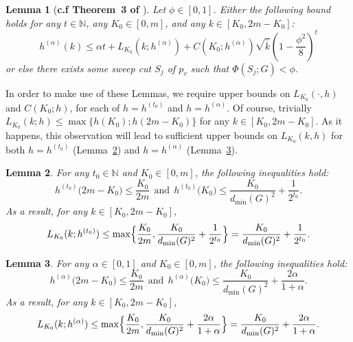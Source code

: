 \documentclass{article}
\newcommand{\1}{\mathbf{1}}
\newtheorem{lemma}{Lemma}[section]
\theoremstyle{definition}
\theoremstyle{remark}
\begin{document}
\begin{lemma}[\textbf{c.f Theorem~3 of \citep{andersen2006}}]
	\label{lem:mixing_time_PPR}
	Let $\phi \in [0,1]$. Either the following bound holds for any $t \in \mathbb{N}$, any $K_0 \in [0,m]$, and any $k \in [K_0,2m - K_0]$:
	\begin{equation}
	\label{eqn:mixing_time_PPR}
	h^{(\alpha)}(k) \leq \alpha t + L_{K_0}(k; h^{(\alpha)}) + C(K_0;h^{(\alpha)})\sqrt{\overline{k}}\left(1 - \frac{\phi^2}{8}\right)^t
	\end{equation}
	or else there exists some sweep cut $S_{j}$ of $p_v$ such that $\Phi(S_j;G) < \phi$.
\end{lemma}

In order to make use of these Lemmas, we require upper bounds on $L_{K_0}(\cdot,h)$ and $C(K_0;h)$, for each of $h = h^{(t_0)}$ and $h = h^{(\alpha)}$. Of course, trivially $L_{K_0}(k;h) \leq \max\{h(K_0); h(2m - K_0)\}$ for any $k \in [K_0, 2m - K_0]$. As it happens, this observation will lead to sufficient upper bounds on $L_{K_0}(k,h)$ for both $h = h^{(t_0)}$ (Lemma~\ref{lem:interpolator_bound_rw}) and $h = h^{(\alpha)}$ (Lemma~\ref{lem:interpolator_bound_ppr}).  
\begin{lemma}
	\label{lem:interpolator_bound_rw}
	For any $t_0 \in \mathbb{N}$ and $K_0 \in [0,m]$, the following inequalities hold:
	\begin{equation}
	\label{eqn:interpolator_bound_rw}
	h^{(t_0)}\bigl(2m - K_0\bigr) \leq \frac{K_0}{2m}~~\textrm{and}~~h^{(t_0)}\bigl(K_0\bigr) \leq \frac{K_0}{d_{\min}(G)^2} + \frac{1}{2^{t_0}}.
	\end{equation}
	As a result, for any $k \in [K_0, 2m - K_0]$,
	\begin{equation}
	\label{eqn:interpolator_bound_rw_2}
	L_{K_0}(k;h^{(t_0)}) \leq \max\Bigl\{\frac{K_0}{2m}, \frac{K_0}{d_{\min}(G)^2} + \frac{1}{2^{t_0}}\Bigr\} = \frac{K_0}{d_{\min}(G)^2} + \frac{1}{2^{t_0}}.
	\end{equation}
\end{lemma}

\begin{lemma}
	\label{lem:interpolator_bound_ppr}
	For any $\alpha \in [0,1]$ and $K_0 \in [0,m]$, the following inequalities hold:
	\begin{equation}
	\label{eqn:interpolator_bound_ppr}
	h^{(\alpha)}\bigl(2m - K_0\bigr) \leq \frac{K_0}{2m}~~\textrm{and}~~h^{(\alpha)}\bigl(K_0\bigr) \leq \frac{K_0}{d_{\min}(G)^2} + \frac{2\alpha}{1 + \alpha}.
	\end{equation}
	As a result, for any $k \in [K_0, 2m - K_0]$,
	\begin{equation}
	\label{eqn:interpolator_bound_ppr_2}
	L_{K_0}(k;h^{(\alpha)}) \leq \max\Bigl\{\frac{K_0}{2m}, \frac{K_0}{d_{\min}(G)^2} + \frac{2\alpha}{1 + \alpha}\Bigr\} = \frac{K_0}{d_{\min}(G)^2} + \frac{2\alpha}{1 + \alpha}.
	\end{equation}
\end{lemma}
\end{document}
